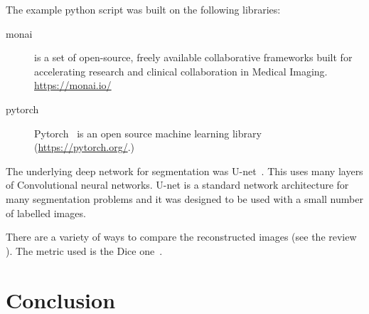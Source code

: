 \documentclass[12pt]{article}
\begin{document}
The example python script was built on the following libraries:

\begin{description}

  \item[monai] is a set of open-source, freely available collaborative frameworks built for accelerating research and clinical collaboration in Medical Imaging.  \url{https://monai.io/}

\item[pytorch] Pytorch~\cite{paszke2019pytorch}
  is an open source machine learning library  (\url{https://pytorch.org/}.)
    
\end{description}

The underlying deep network for segmentation was
U-net~\cite{ronneberger2015u}.  This uses many layers of Convolutional
neural networks.  U-net is a standard network architecture for many
segmentation problems and it was designed to be used with a small
number of labelled images.




There are a variety of ways to compare the reconstructed
images (see the review~\cite{taha2015metrics} ).
The metric used is the Dice one~\cite{zijdenbos1994morphometric}.

\subsection{}

\section{Conclusion}



\end{document}
